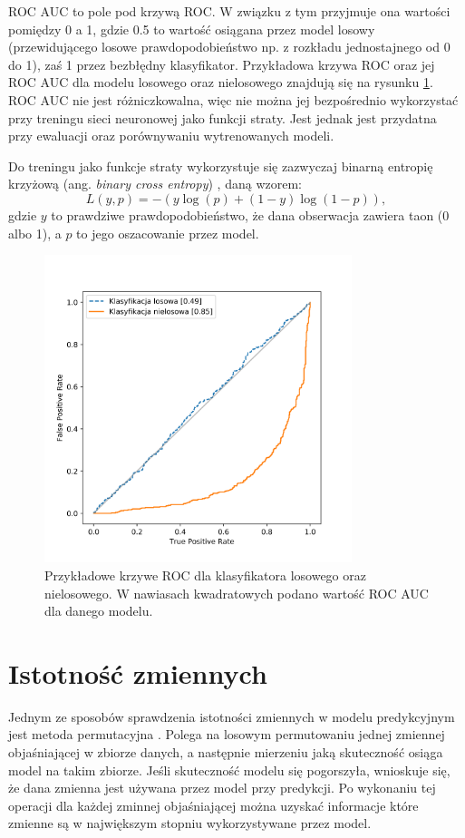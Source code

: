 \documentclass{pracalicmgr}
\begin{document}
	ROC AUC to pole pod krzywą ROC. W związku z tym przyjmuje ona wartości pomiędzy 0 a 1, gdzie 0.5 to wartość osiągana przez model losowy (przewidującego losowe prawdopodobieństwo np. z rozkładu jednostajnego od 0 do 1), zaś 1 przez bezbłędny klasyfikator. Przykładowa krzywa ROC oraz jej ROC AUC dla modelu losowego oraz nielosowego znajdują się na rysunku \ref{fig:roc}. ROC AUC nie jest różniczkowalna, więc nie można jej bezpośrednio wykorzystać przy treningu sieci neuronowej jako funkcji straty. Jest jednak jest przydatna przy ewaluacji oraz porównywaniu wytrenowanych modeli. 
	
	Do treningu jako funkcje straty wykorzystuje się zazwyczaj binarną entropię krzyżową (ang. \textit{binary cross entropy}) \cite{dl}, daną wzorem: $$ L(y, p) = -(y\log(p)+(1-y)\log(1-p)),$$ gdzie $y$ to prawdziwe prawdopodobieństwo, że dana obserwacja zawiera taon (0 albo 1), a $p$ to jego oszacowanie przez model.

	\begin{figure}[h]
	\centering
	\includegraphics[width=0.8\textwidth]{roc_example.png}
	\caption{Przykładowe krzywe ROC dla klasyfikatora losowego oraz nielosowego. W nawiasach kwadratowych podano wartość ROC AUC dla danego modelu.}
	\label{fig:roc}
	\end{figure}
	
	\section{Istotność zmiennych}
	Jednym ze sposobów sprawdzenia istotności zmiennych w modelu predykcyjnym jest metoda permutacyjna \cite{breiman2001random}. Polega na losowym permutowaniu jednej zmiennej objaśniającej w zbiorze danych, a następnie mierzeniu jaką skuteczność osiąga model na takim zbiorze. Jeśli skuteczność modelu się pogorszyła, wnioskuje się, że dana zmienna jest używana przez model przy predykcji.  Po wykonaniu tej operacji dla każdej zminnej objaśniającej można uzyskać informacje które zmienne są w największym stopniu wykorzystywane przez model.
	
\end{document}
